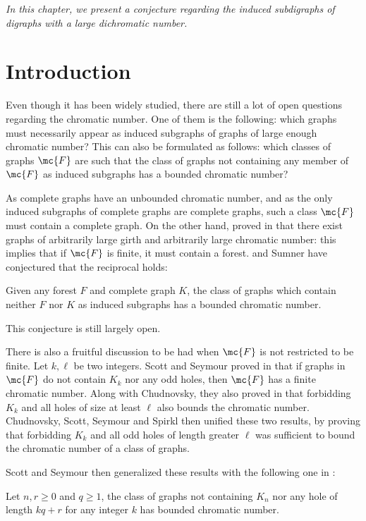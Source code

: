 \emph{In this chapter, we present a conjecture regarding the induced subdigraphs of digraphs with a large dichromatic number.}

\section{Introduction}

Even though it has been widely studied, there are still a lot of open questions regarding the chromatic number. One of them is the following: which graphs must necessarily appear as induced subgraphs of graphs of large enough chromatic number? This can also be formulated as follows: which classes of graphs $\mc{F}$ are such that the class of graphs not containing any member of $\mc{F}$ as induced subgraphs has a bounded chromatic number? %

As complete graphs have an unbounded chromatic number, and as the only induced subgraphs of complete graphs are complete graphs, such a class $\mc{F}$ must contain a complete graph. On the other hand, \Erd proved in \cite{E59} that there exist graphs of arbitrarily large girth and arbitrarily large chromatic number: this implies that if $\mc{F}$ is finite, it must contain a forest. \Gya and Sumner have conjectured that the reciprocal holds:

\begin{conjecture}
    Given any forest $F$ and complete graph $K$, the class of graphs which contain neither $F$ nor $K$ as induced subgraphs has a bounded chromatic number.
\end{conjecture}

This conjecture is still largely open.

\medskip

There is also a fruitful discussion to be had when $\mc{F}$ is not restricted to be finite. Let $k, \ell$ be two integers. Scott and Seymour proved in \cite{SS16} that if graphs in $\mc{F}$ do not contain $K_k$ nor any odd holes, then $\mc{F}$ has a finite chromatic number. Along with Chudnovsky, they also proved in \cite{CSS17} that forbidding $K_k$ and all holes of size at least $\ell$ also bounds the chromatic number. Chudnovsky, Scott, Seymour and Spirkl then unified these two results, by proving that forbidding $K_k$ and all odd holes of length greater $\ell$ was sufficient to bound the chromatic number of a class of graphs. 

Scott and Seymour then generalized these results with the following one in \cite{SS20brooms}:
\begin{theorem}
    Let $n,r \geq 0$ and $q \geq 1$, the class of graphs not containing $K_n$ nor any hole of length $kq + r$ for any integer $k$ has bounded chromatic number.
\end{theorem}

